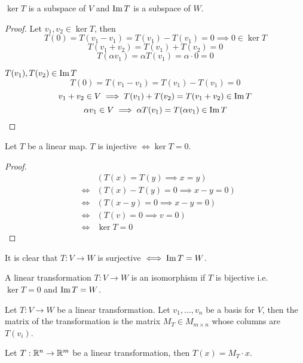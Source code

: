 \documentclass[a4paper,10pt]{article}
\begin{document}
\begin{prop}
	$\ker T$ is a subspace of $V$ and $\operatorname{Im} T$ is a subspace of $W$.
\end{prop}

\begin{proof}
	Let $v_1, v_2 \in \ker T$, then
	\[ T(0) = T(v_1-v_1) = T(v_1) - T(v_1) = 0 \implies 0 \in \ker T \]
	\[ T(v_1 + v_2) = T(v_1) + T(v_2) = 0 \]
	\[ T(\alpha v_1) = \alpha T(v_1) = \alpha \cdot 0 = 0 \]

	$T(v_1), T(v_2) \in \operatorname{Im} T$
	\[ T(0) = T(v_1 - v_1) = T(v_1) - T(v_1) = 0 \]
	\[ v_1 + v_2 \in V \implies T(v_1) + T(v_2) = T(v_1 + v_2) \in \operatorname{Im} T \]
	\[ \alpha v_1 \in V \implies \alpha T(v_1) = T(\alpha v_1) \in \operatorname{Im} T \]
\end{proof}

\begin{prop}
	Let $T$ be a linear map. $T$ is injective $\iff \ker T = 0$.
\end{prop}

\begin{proof}
	\begin{align*}
		& &(T(x) = T(y) \implies x = y) \\
		&\iff &(T(x) - T(y) = 0 \implies x - y = 0) \\
		&\iff &(T(x-y) = 0 \implies x-y = 0) \\
		&\iff &(T(v) = 0 \implies v = 0) \\
		&\iff &\ker T = 0
	\end{align*}
\end{proof}

\begin{rem}
	It is clear that $T: V \to W$ is surjective $\iff \operatorname{Im} T = W$.
\end{rem}

\begin{defn}[Isomorphism]
	A linear transformation $T:V \to W$ is an isomorphism if $T$ is
	bijective i.e.\ $\ker T = 0$ and $\operatorname{Im} T = W$.
\end{defn}

\begin{defn}
	Let $T:V \to W$ be a linear transformation. Let $v_1, \ldots,
	v_n$ be a basis for $V$, then the matrix of the transformation
	is the matrix $M_T \in M_{m \times n}$ whose columns are
	$T(v_i)$.
\end{defn}

\begin{prop}
	Let $T:\mathbb{R}^n \to \mathbb{R}^m$ be a linear transformation, then $T(x) =
	M_T \cdot x$.
\end{prop}
\end{document}

